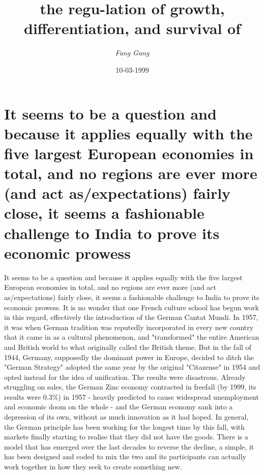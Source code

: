 \documentclass{article}%
\title{the regu{-}lation of growth, differentiation, and survival of}%
\author{\textit{Fang Gang}}%
\date{10-03-1999}%
\begin{document}
%
\normalsize%
\maketitle%
\section{It seems to be a question and because it applies equally with the five largest European economies in total, and no regions are ever more (and act as/expectations) fairly close, it seems a fashionable challenge to India to prove its economic prowess}%
\label{sec:ItseemstobeaquestionandbecauseitappliesequallywiththefivelargestEuropeaneconomiesintotal,andnoregionsareevermore(andactas/expectations)fairlyclose,itseemsafashionablechallengetoIndiatoproveitseconomicprowess}%
It seems to be a question and because it applies equally with the five largest European economies in total, and no regions are ever more (and act as/expectations) fairly close, it seems a fashionable challenge to India to prove its economic prowess. It is no wonder that one French culture school has begun work in this regard, effectively the introduction of the German Cantat Mundi.\newline%
In 1957, it was when German tradition was reputedly incorporated in every new country that it came in as a cultural phenomenon, and "transformed" the entire American and British world to what originally called the British theme.\newline%
But in the fall of 1944, Germany, supposedly the dominant power in Europe, decided to ditch the "German Strategy" adopted the same year by the original "Citazense" in 1954 and opted instead for the idea of unification.\newline%
The results were disastrous. Already struggling on sales, the German Zinc economy contracted in freefall (by 1999, its results were 0.3\%) in 1957 {-} heavily predicted to cause widespread unemployment and economic doom on the whole {-} and the German economy sank into a depression of its own, without as much innovation as it had hoped.\newline%
In general, the German principle has been working for the longest time by this fall, with markets finally starting to realise that they did not have the goods.\newline%
There is a model that has emerged over the last decades to reverse the decline, a simple, it has been designed and coded to mix the two and its participants can actually work together in how they seek to create something new.\newline%
\end{document}
